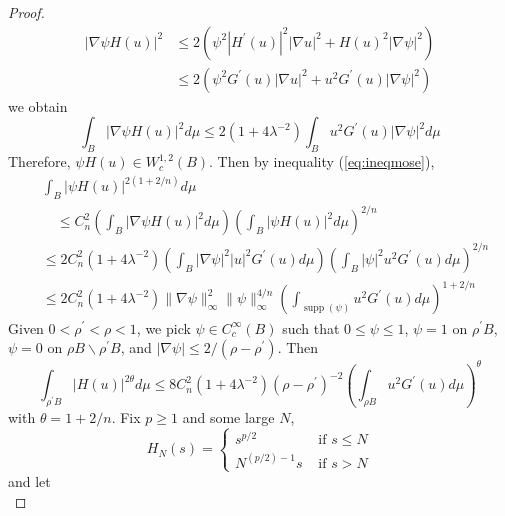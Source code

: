 \begin{enumerate}[label=\Roman*.]
\begin{proof}
\begin{equation*}
\begin{aligned}
				|\nabla \psi H(u)|^2 & \leq 2\left(\psi^2\left|H^{\prime}(u)\right|^2|\nabla u|^2+H(u)^2|\nabla \psi|^2\right) \\
				& \leq 2\left(\psi^2 G^{\prime}(u)|\nabla u|^2+u^2 G^{\prime}(u)|\nabla \psi|^2\right)
			\end{aligned}
		\end{equation*}
		we obtain
		\begin{equation*}
			\int_B|\nabla \psi H(u)|^2 d \mu \leq 2\left(1+4 \lambda^{-2}\right) \int_B u^2 G^{\prime}(u)|\nabla \psi|^2 d \mu
		\end{equation*}
		Therefore, $\psi H(u) \in W^{1,2}_c(B)$. Then by inequality (\ref{eq:ineqmose}),
		\begin{equation*}
			\begin{aligned}
				& \int_B|\psi H(u)|^{2(1+2 / n)} d \mu \\
				& \quad \leq C_n^2\left(\int_B|\nabla \psi H(u)|^2 d \mu\right)\left(\int_B|\psi H(u)|^2 d \mu\right)^{2 / n} \\
				& \leq 2 C_n^2\left(1+4 \lambda^{-2}\right)\left(\int_B|\nabla \psi|^2|u|^2 G^{\prime}(u) d \mu\right)\left(\int_B|\psi|^2 u^2 G^{\prime}(u) d \mu\right)^{2 / n} \\
				& \leq 2 C_n^2\left(1+4 \lambda^{-2}\right)\|\nabla \psi\|_{\infty}^2\|\psi\|_{\infty}^{4 / n}\left(\int_{\operatorname{supp}(\psi)} u^2 G^{\prime}(u) d \mu\right)^{1+2 / n}
			\end{aligned}
		\end{equation*}
		Given $0<\rho^{\prime}<\rho<1$, we pick $\psi \in C_c^\infty(B)$ such that $0 \leq \psi \leq 1$, $\psi = 1$ on $\rho^\prime B$, $\psi = 0$ on $\rho B \backslash \rho^\prime B$, and $|\nabla \psi| \leq 2 /\left(\rho-\rho^{\prime}\right)$. Then
		\begin{equation*}
			\int_{\rho^{\prime} B}|H(u)|^{2 \theta} d \mu \leq 8 C_n^2\left(1+4 \lambda^{-2}\right)\left(\rho-\rho^{\prime}\right)^{-2}\left(\int_{\rho B} u^2 G^{\prime}(u) d \mu\right)^\theta
		\end{equation*}
		with $\theta = 1 + 2/n$. Fix $p \geq 1$ and some large $N$,
		\begin{equation*}
			H_N(s)=\left\{
				\begin{array}{cc}
					s^{p / 2} & \text { if } s \leq N \\
					N^{(p / 2)-1} s & \text { if } s>N
				\end{array}\right.
		\end{equation*}
		and let
		\begin{equation*}

\end{equation*}
\end{proof}
\end{enumerate}
